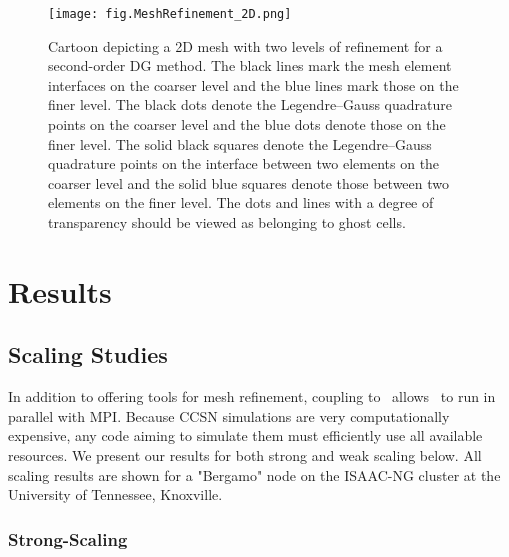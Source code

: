 \begin{figure}[htb!]
  \centering
  \texttt{[image: fig.MeshRefinement\_2D.png]}
  \caption{Cartoon depicting a 2D mesh with two levels of refinement
  for a second-order DG method.
  The black lines mark the mesh element interfaces on the coarser level
  and the blue lines mark those on the finer level.
  The black dots denote the Legendre--Gauss quadrature points on the coarser
  level and the blue dots denote those on the finer level.
  The solid black squares denote the Legendre--Gauss quadrature points
  on the interface between two elements on the coarser level and the solid blue
  squares denote those between two elements on the finer level.
  The dots and lines with a degree of transparency should be viewed as
  belonging to ghost cells.
  }
  \label{fig.MR2D}
\end{figure}

\section{Results}

\subsection{Scaling Studies}

In addition to offering tools for mesh refinement, coupling to \amrex\
allows \thornado\ to run in parallel with MPI.
Because CCSN simulations are very computationally expensive,
any code aiming to simulate them must efficiently use all available
resources.
We present our results for both strong and weak scaling below.
All scaling results are shown for a "Bergamo" node on the ISAAC-NG
cluster at the University of Tennessee, Knoxville.

\subsubsection{Strong-Scaling}

